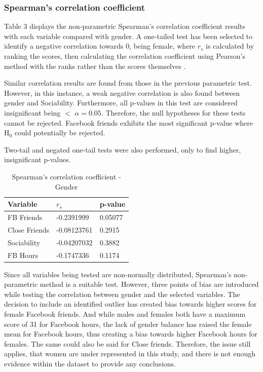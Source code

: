 \newpage
\subsubsection{Spearman's correlation coefficient}

Table 3 displays the non-parametric Spearman's correlation coefficient results with each variable compared with gender. A one-tailed test has been selected to identify a negative correlation towards 0, being female, where $r_s$ is calculated by ranking the scores, then calculating the correlation coefficient using Pearson's method with the ranks rather than the scores themselves \citep{McKillup2011}.

Similar correlation results are found from those in the previous parametric test. However, in this instance, a weak negative correlation is also found between gender and Sociability. Furthermore, all p-values in this test are considered insignificant being $<$ $\alpha = 0.05$. Therefore, the null hypotheses for these tests cannot be rejected. Facebook friends exhibits the most significant p-value where H$_0$ could potentially be rejected.

Two-tail and negated one-tail tests were also performed, only to find higher, insignificant p-values.

\begin{table}[H]
\centering
\caption{Spearman's correlation coefficient - Gender}
\begin{tabular}{l|l|l}
Variable      & $r_s$      & p-value \\ \hline
FB Friends    & -0.2391999  & 0.05077 \\ \hline
Close Friends & -0.08123761 & 0.2915  \\ \hline
Sociability   & -0.04207032 & 0.3882  \\ \hline
FB Hours      & -0.1747336  & 0.1174  \\ \hline
\end{tabular}
\end{table}

Since all variables being tested are non-normally distributed, Spearman's non-parametric method is a suitable test. However, three points of bias are introduced while testing the correlation between gender and the selected variables. The decision to include an identified outlier has created bias towards higher scores for female Facebook friends. And while males and females both have a maximum score of 31 for Facebook hours, the lack of gender balance has raised the female mean for Facebook hours, thus creating a bias towards higher Facebook hours for females. The same could also be said for Close friends. Therefore, the issue still applies, that women are under represented in this study, and there is not enough evidence within the dataset to provide any conclusions.

